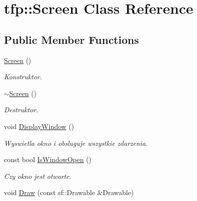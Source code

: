 \hypertarget{classtfp_1_1_screen}{}\section{tfp\+:\+:Screen Class Reference}
\label{classtfp_1_1_screen}
\subsection*{Public Member Functions}
\begin{DoxyCompactItemize}
\item 
\mbox{\hyperlink{classtfp_1_1_screen_a8a5d28db3e41c9e816dc1ea6a6aa9a81}{Screen}} ()
\begin{DoxyCompactList}\small\item\em Konstruktor. \end{DoxyCompactList}\item 
\mbox{\label{classtfp_1_1_screen_ace30a792f8887193324d999b5686cae3}} 
\mbox{\hyperlink{classtfp_1_1_screen_ace30a792f8887193324d999b5686cae3}{$\sim$\+Screen}} ()
\begin{DoxyCompactList}\small\item\em Destruktor. \end{DoxyCompactList}\item 
\mbox{\label{classtfp_1_1_screen_a67d43bfb9e822042feb60457e915c9ff}} 
void \mbox{\hyperlink{classtfp_1_1_screen_a67d43bfb9e822042feb60457e915c9ff}{Display\+Window}} ()
\begin{DoxyCompactList}\small\item\em Wyswietla okno i obsluguje wszystkie zdarzenia. \end{DoxyCompactList}\item 
\mbox{\label{classtfp_1_1_screen_a63867d99a2023ca238375281c8b810f0}} 
const bool \mbox{\hyperlink{classtfp_1_1_screen_a63867d99a2023ca238375281c8b810f0}{Is\+Window\+Open}} ()
\begin{DoxyCompactList}\small\item\em Czy okno jest otwarte. \end{DoxyCompactList}\item 
\mbox{\label{classtfp_1_1_screen_abf2439c27caf3e12742a5d1f6f4e6c55}} 
void \mbox{\hyperlink{classtfp_1_1_screen_abf2439c27caf3e12742a5d1f6f4e6c55}{Draw}} (const sf\+::\+Drawable \&Drawable)

\end{DoxyCompactItemize}
